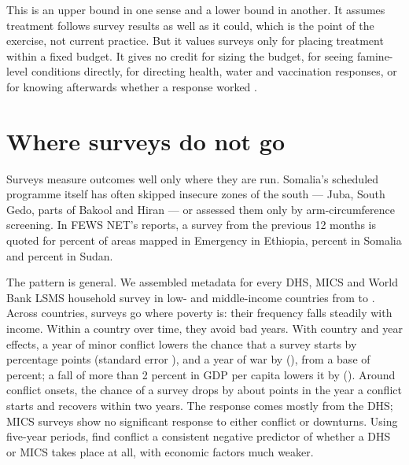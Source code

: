 \documentclass[11pt]{article}
\begin{document}
This is an upper bound in one sense and a lower bound in another. It assumes treatment follows survey results as well as it could, which is the point of the exercise, not current practice. But it values surveys only for placing treatment within a fixed budget. It gives no credit for sizing the budget, for seeing famine-level conditions directly, for directing health, water and vaccination responses, or for knowing afterwards whether a response worked \citep{kenny2026humanitarian}.

\section{Where surveys do not go}\label{sec:gaps}

Surveys measure outcomes well only where they are run. Somalia's scheduled programme itself has often skipped insecure zones of the south --- Juba, South Gedo, parts of Bakool and Hiran --- or assessed them only by arm-circumference screening. In FEWS NET's reports, a survey from the previous 12 months is quoted for \svEmergET{} percent of areas mapped in Emergency in Ethiopia, \svEmergSO{} percent in Somalia and \svEmergSD{} percent in Sudan.

The pattern is general. We assembled metadata for every DHS, MICS and World Bank LSMS household survey in \gapCountries{} low- and middle-income countries from \gapYearZero{} to \gapYearOne{}. Across countries, surveys go where poverty is: their frequency falls steadily with income. Within a country over time, they avoid bad years. With country and year effects, a year of minor conflict lowers the chance that a survey starts by \gapAnyMinor{} percentage points (standard error \gapAnyMinorSe{}), and a year of war by \gapAnyWar{} (\gapAnyWarSe{}), from a base of \gapBase{} percent; a fall of more than 2 percent in GDP per capita lowers it by \gapAnyDown{} (\gapAnyDownSe{}). Around \gapOnsets{} conflict onsets, the chance of a survey drops by about \gapOnsetDrop{} points in the year a conflict starts and recovers within two years. The response comes mostly from the DHS; MICS surveys show no significant response to either conflict or downturns. Using five-year periods, \citet{trommlerova2026disease} find conflict a consistent negative predictor of whether a DHS or MICS takes place at all, with economic factors much weaker.
\end{document}
